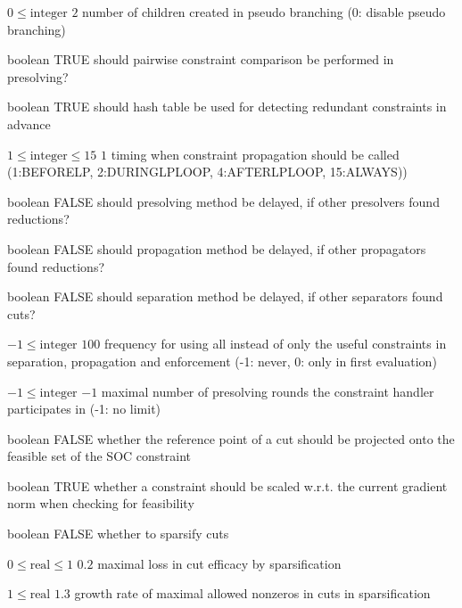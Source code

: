 %
{$0\leq\textrm{integer}$}%
{$2$}%
{number of children created in pseudo branching (0: disable pseudo branching)}%
{}

%
{boolean}%
{TRUE}%
{should pairwise constraint comparison be performed in presolving?}%
{}

%
{boolean}%
{TRUE}%
{should hash table be used for detecting redundant constraints in advance}%
{}

%
{$1\leq\textrm{integer}\leq15$}%
{$1$}%
{timing when constraint propagation should be called (1:BEFORELP, 2:DURINGLPLOOP, 4:AFTERLPLOOP, 15:ALWAYS))}%
{}

%
{boolean}%
{FALSE}%
{should presolving method be delayed, if other presolvers found reductions?}%
{}

%
{boolean}%
{FALSE}%
{should propagation method be delayed, if other propagators found reductions?}%
{}

%
{boolean}%
{FALSE}%
{should separation method be delayed, if other separators found cuts?}%
{}

%
{$-1\leq\textrm{integer}$}%
{$100$}%
{frequency for using all instead of only the useful constraints in separation, propagation and enforcement (-1: never, 0: only in first evaluation)}%
{}

%
{$-1\leq\textrm{integer}$}%
{$-1$}%
{maximal number of presolving rounds the constraint handler participates in (-1: no limit)}%
{}

%
{boolean}%
{FALSE}%
{whether the reference point of a cut should be projected onto the feasible set of the SOC constraint}%
{}

%
{boolean}%
{TRUE}%
{whether a constraint should be scaled w.r.t. the current gradient norm when checking for feasibility}%
{}

%
{boolean}%
{FALSE}%
{whether to sparsify cuts}%
{}

%
{$0\leq\textrm{real}\leq1$}%
{$0.2$}%
{maximal loss in cut efficacy by sparsification}%
{}

%
{$1\leq\textrm{real}$}%
{$1.3$}%
{growth rate of maximal allowed nonzeros in cuts in sparsification}%
{}

